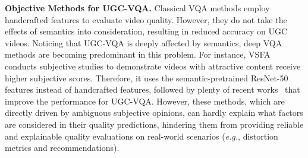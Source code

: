 \documentclass[10pt,twocolumn,letterpaper]{article}
\renewcommand{\paragraph}[1]{\noindent \textbf{#1}}
\begin{document}
\paragraph{Objective Methods for UGC-VQA.}
Classical VQA methods \cite{niqe,bofqa,rrstedqa,diivine,stgreed,vmaf,tlvqm,videval,brisque,viideo,vbliinds,tpqi} employ handcrafted features to evaluate video quality. However, they do not take the effects of semantics into consideration, resulting in reduced accuracy on UGC videos.
Noticing that UGC-VQA is deeply affected by semantics, deep VQA methods \cite{fastvqa, dctqa, cnn+lstm,deepvqa, gstvqa, vsfa, mlsp, rirnet, dstsvqa, svqa, mdtvsfa} are becoming predominant in this problem. For instance, VSFA~\cite{vsfa} conducts subjective studies to demonstrate videos with attractive content receive higher subjective scores. Therefore, it uses the semantic-pretrained  ResNet-50~\cite{he2016residual} features instead of handcrafted features, followed by plenty of recent works~\cite{lsctphiq,pvq,cnntlvqm,mlsp,fastvqa,discovqa} that improve the performance for UGC-VQA. However, these methods, which are directly driven by ambiguous subjective opinions, can hardly explain what factors are considered in their quality predictions, hindering them from providing reliable and explainable quality evaluations on real-world scenarios (\textit{e.g.}, distortion metrics and recommendations).
\end{document}
